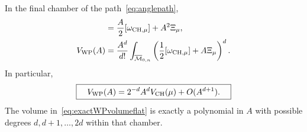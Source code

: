 \begin{proposition}
In the final chamber of the path~\eqref{eq:anglepath},
\begin{align}
 [\omega_{\WP}(A)]
   &=\frac A2[\omega_{\mathrm{CH},\mu}]+A^2\Xi_\mu,
       \label{eq:exactWPclassflat}\\
 V_{\WP}(A)
   &=\frac{A^d}{d!}\int_{\MM_{0,n}}
       \left(\frac12[\omega_{\mathrm{CH},\mu}]+A\Xi_\mu\right)^d.
       \label{eq:exactWPvolumeflat}
\end{align}
In particular,
\begin{equation}
 \boxed{\quad
 V_{\mathrm{WP}}(A)=2^{-d}A^d V_{\mathrm{CH}}(\mu)+O(A^{d+1}).
 \quad}
 \label{eq:WPCHvolumeasymptotic}
\end{equation}
The volume in~\eqref{eq:exactWPvolumeflat} is exactly a polynomial in
$A$ with possible degrees $d,d+1,\ldots,2d$ within that chamber.
\end{proposition}

